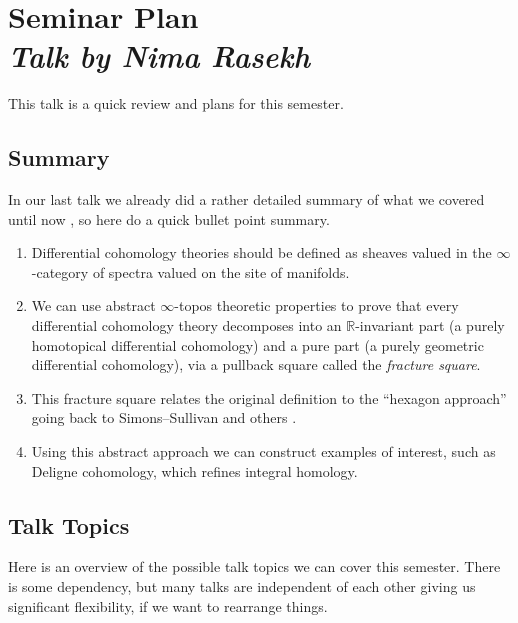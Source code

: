 \documentclass[a4paper]{book}
\newcommand{\bR}{\mathbb{R}}
\theoremstyle{definition}
\theoremstyle{remark}
\numberwithin{equation}{section}
\begin{document}
\chapter{Seminar Plan \texorpdfstring{\\}{ } \normalsize \emph{Talk by Nima Rasekh}}

This talk is a quick review and plans for this semester.


\section{Summary}
In our last talk we already did a rather detailed summary of what we covered until now \cite{rasekh2025diffcoh5}, so here do a quick bullet point summary.
\begin{enumerate}
  \item Differential cohomology theories should be defined as sheaves valued in the $\infty$-category of spectra valued on the site of manifolds. 
  \item We can use abstract $\infty$-topos theoretic properties to prove that every differential cohomology theory decomposes into an $\bR$-invariant part (a purely homotopical differential cohomology) and a pure part (a purely geometric differential cohomology), via a pullback square called the \emph{fracture square}. 
  \item This fracture square relates the original definition to the ``hexagon approach'' going back to Simons--Sullivan and others \cite{simonssullivan2008diffcoh,bunkeschick2009smoothk}.
  \item Using this abstract approach we can construct examples of interest, such as Deligne cohomology, which refines integral homology.
\end{enumerate}

\section{Talk Topics}
Here is an overview of the possible talk topics we can cover this semester. There is some dependency, but many talks are independent of each other giving us significant flexibility, if we want to rearrange things.
\end{document}
